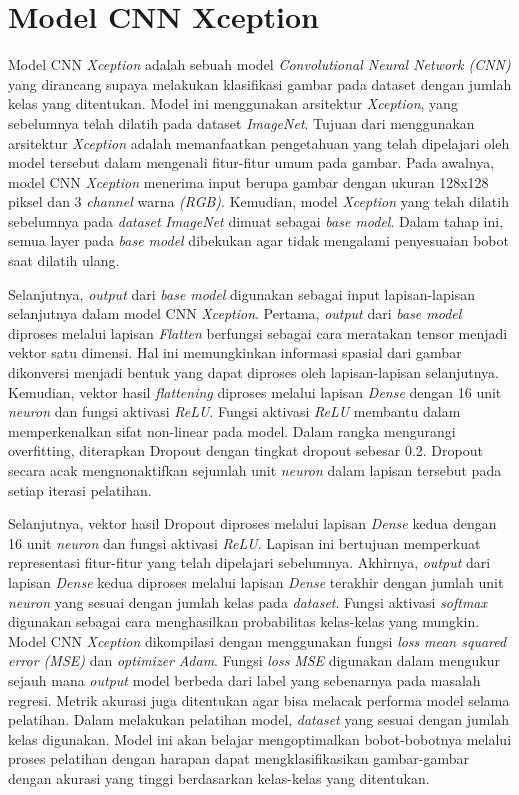 \section{Model CNN Xception}
Model CNN \textit{Xception} adalah sebuah model \textit{Convolutional Neural Network (CNN)} yang dirancang supaya melakukan klasifikasi gambar pada dataset dengan jumlah kelas yang ditentukan. Model ini menggunakan arsitektur \textit{Xception}, yang sebelumnya telah dilatih pada dataset \textit{ImageNet}. Tujuan dari menggunakan arsitektur \textit{Xception} adalah  memanfaatkan pengetahuan yang telah dipelajari oleh model tersebut dalam mengenali fitur-fitur umum pada gambar. Pada awalnya, model CNN \textit{Xception} menerima input berupa gambar dengan ukuran 128x128 piksel dan 3 \textit{channel} warna \textit{(RGB)}. Kemudian, model \textit{Xception} yang telah dilatih sebelumnya pada \textit{dataset} \textit{ImageNet} dimuat sebagai \textit{base model}. Dalam tahap ini, semua layer pada \textit{base model} dibekukan agar tidak mengalami penyesuaian bobot saat dilatih ulang.

Selanjutnya, \textit{output} dari \textit{base model} digunakan sebagai input lapisan-lapisan selanjutnya dalam model CNN \textit{Xception}. Pertama, \textit{output} dari \textit{base model} diproses melalui lapisan \textit{Flatten} berfungsi sebagai cara meratakan tensor menjadi vektor satu dimensi. Hal ini memungkinkan informasi spasial dari gambar dikonversi menjadi bentuk yang dapat diproses oleh lapisan-lapisan selanjutnya. Kemudian, vektor hasil \textit{flattening} diproses melalui lapisan \textit{Dense} dengan 16 unit \textit{neuron} dan fungsi aktivasi \textit{ReLU}. Fungsi aktivasi \textit{ReLU} membantu dalam memperkenalkan sifat non-linear pada model. Dalam rangka mengurangi overfitting, diterapkan Dropout dengan tingkat dropout sebesar 0.2. Dropout secara acak mengnonaktifkan sejumlah unit \textit{neuron} dalam lapisan tersebut pada setiap iterasi pelatihan.

Selanjutnya, vektor hasil Dropout diproses melalui lapisan \textit{Dense} kedua dengan 16 unit \textit{neuron} dan fungsi aktivasi \textit{ReLU}. Lapisan ini bertujuan memperkuat representasi fitur-fitur yang telah dipelajari sebelumnya. Akhirnya, \textit{output} dari lapisan \textit{Dense} kedua diproses melalui lapisan \textit{Dense} terakhir dengan jumlah unit \textit{neuron} yang sesuai dengan jumlah kelas pada \textit{dataset}. Fungsi aktivasi \textit{softmax} digunakan sebagai cara menghasilkan probabilitas kelas-kelas yang mungkin. Model CNN \textit{Xception} dikompilasi dengan menggunakan fungsi \textit{loss} \textit{mean squared error (MSE)} dan \textit{optimizer} \textit{Adam}. Fungsi \textit{loss} \textit{MSE} digunakan dalam mengukur sejauh mana \textit{output} model berbeda dari label yang sebenarnya pada masalah regresi. Metrik akurasi juga ditentukan agar bisa melacak performa model selama pelatihan. Dalam melakukan pelatihan model, \textit{dataset} yang sesuai dengan jumlah kelas digunakan. Model ini akan belajar mengoptimalkan bobot-bobotnya melalui proses pelatihan dengan harapan dapat mengklasifikasikan gambar-gambar dengan akurasi yang tinggi berdasarkan kelas-kelas yang ditentukan.


